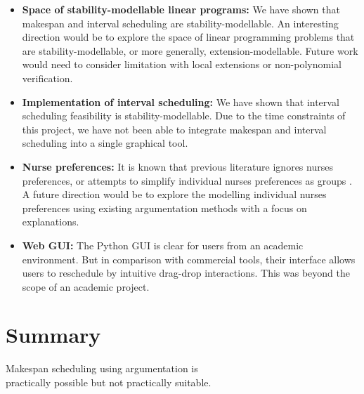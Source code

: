 \begin{itemize}
	\item\textbf{Space of stability-modellable linear programs:} We have shown that makespan and interval scheduling are stability-modellable. An interesting direction would be to explore the space of linear programming problems that are stability-modellable, or more generally, extension-modellable. Future work would need to consider limitation with local extensions or non-polynomial verification.
	\item\textbf{Implementation of interval scheduling:} We have shown that interval scheduling feasibility is stability-modellable. Due to the time constraints of this project, we have not been able to integrate makespan and interval scheduling into a single graphical tool.
	\item\textbf{Nurse preferences:} It is known that previous literature ignores nurses preferences, or attempts to simplify individual nurses preferences as groups \cite{preferences}. A future direction would be to explore the modelling individual nurses preferences using existing argumentation methods \cite{acceptability, aba} with a focus on explanations.
	\item\textbf{Web GUI:} The Python GUI is clear for users from an academic environment. But in comparison with commercial tools, their interface allows users to reschedule by intuitive drag-drop interactions. This was beyond the scope of an academic project.
\end{itemize}

\section{Summary}

\begin{framed}
	\centering
	Makespan scheduling using argumentation is\\practically
	possible but not practically suitable.
\end{framed}